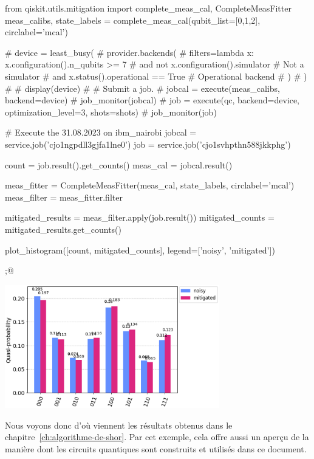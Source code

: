 \begin{pyin}
from qiskit.utils.mitigation import complete_meas_cal, CompleteMeasFitter
meas_calibs, state_labels = complete_meas_cal(qubit_list=[0,1,2], circlabel='mcal')

# device = least_busy(
#     provider.backends(
#         filters=lambda x: x.configuration().n_qubits >= 7
#                           and not x.configuration().simulator                # Not a simulator
#                           and x.status().operational == True                 # Operational backend
#     )
# )
#
# display(device)
#
# Submit a job.
# jobcal = execute(meas_calibs, backend=device)
# job_monitor(jobcal)
# job = execute(qc, backend=device, optimization_level=3, shots=shots)
# job_monitor(job)

# Execute the 31.08.2023 on ibm_nairobi
jobcal = service.job('cjo1ngpdll3gjfa1lne0')
job = service.job('cjo1svhpthn588jkkphg')

count = job.result().get_counts()
meas_cal = jobcal.result()

meas_fitter = CompleteMeasFitter(meas_cal, state_labels, circlabel='mcal')
meas_filter = meas_fitter.filter

mitigated_results = meas_filter.apply(job.result())
mitigated_counts = mitigated_results.get_counts()

plot_histogram([count, mitigated_counts], legend=['noisy', 'mitigated'])
\end{pyin}

\begin{pyout}
;@ \begin{center}\includegraphics[width=0.7\textwidth]{images/appendix/out16.eps}\end{center}
\end{pyout}

Nous voyons donc d'où viennent les résultats obtenus dans le chapitre~\ref{ch:algorithme-de-shor}.
Par cet exemple, cela offre aussi un aperçu de la manière dont les circuits quantiques sont construits
et utilisés dans ce document.
